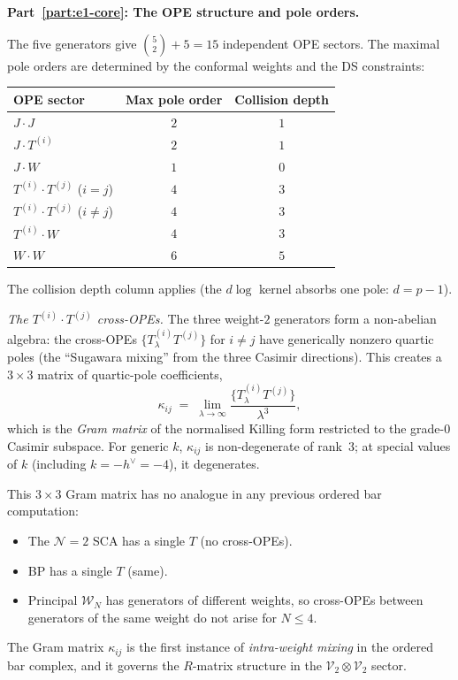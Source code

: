 \begin{computation}
\medskip
\noindent\textbf{Part~\ref{part:e1-core}: The OPE structure and pole
orders.}

The five generators give $\binom{5}{2}+5 = 15$
independent OPE sectors. The maximal pole orders are
determined by the conformal weights and the DS constraints:

\begin{center}
\renewcommand{\arraystretch}{1.15}
\begin{tabular}{lcc}
\textbf{OPE sector} & \textbf{Max pole order}
 & \textbf{Collision depth} \\
\hline
$J \cdot J$ & $2$ & $1$ \\
$J \cdot T^{(i)}$ & $2$ & $1$ \\
$J \cdot W$ & $1$ & $0$ \\
$T^{(i)} \cdot T^{(j)}$ ($i=j$) & $4$ & $3$ \\
$T^{(i)} \cdot T^{(j)}$ ($i\neq j$) & $4$ & $3$ \\
$T^{(i)} \cdot W$ & $4$ & $3$ \\
$W \cdot W$ & $6$ & $5$
\end{tabular}
\end{center}
The collision depth column applies (the $d\log$ kernel
absorbs one pole: $d = p - 1$).

\emph{The $T^{(i)} \cdot T^{(j)}$ cross-OPEs.}
The three weight-$2$ generators form a non-abelian
algebra: the cross-OPEs $\{T^{(i)}_\lambda T^{(j)}\}$
for $i \neq j$ have generically nonzero quartic poles
(the ``Sugawara mixing'' from the three Casimir directions).
This creates a $3 \times 3$ matrix of quartic-pole
coefficients,
\[
\kappa_{ij}
\;=\;
\lim_{\lambda\to\infty}
\frac{\{T^{(i)}_\lambda T^{(j)}\}}{\lambda^3},
\]
which is the \emph{Gram matrix} of the normalised Killing
form restricted to the grade-$0$ Casimir subspace. For
generic $k$, $\kappa_{ij}$ is non-degenerate of rank~$3$;
at special values of $k$ (including $k=-h^\vee=-4$), it
degenerates.

This $3\times 3$ Gram matrix has no analogue in any
previous ordered bar computation:
\begin{itemize}
\item The $\mathcal N=2$ SCA has a single $T$ (no cross-OPEs).
\item BP has a single $T$ (same).
\item Principal $\mathcal W_N$ has generators of different
 weights, so cross-OPEs between generators of the same
 weight do not arise for $N\le 4$.
\end{itemize}
The Gram matrix $\kappa_{ij}$ is the first instance of
\emph{intra-weight mixing} in the ordered bar complex,
and it governs the $R$-matrix structure in the
$\mathcal V_2 \otimes \mathcal V_2$ sector.


\end{computation}

